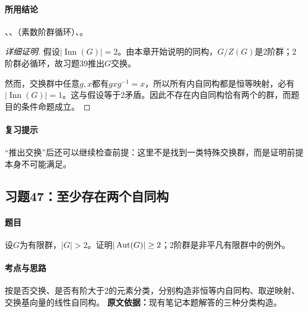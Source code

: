\paragraph{所用结论}、、（素数阶群循环）、。
\begin{proof}[详细证明]
假设$|\operatorname{Inn}(G)|=2$。由本章开始说明的同构，$G/Z(G)$是2阶群；2阶群必循环，故习题39推出$G$交换。

然而，交换群中任意$g,x$都有$gxg^{-1}=x$，所以所有内自同构都是恒等映射，必有$|\operatorname{Inn}(G)|=1$。这与假设等于2矛盾。因此不存在内自同构恰有两个的群，而题目的条件命题成立。
\end{proof}
\paragraph{复习提示}“推出交换”后还可以继续检查前提：这里不是找到一类特殊交换群，而是证明前提本身不可能满足。

\subsection{习题47：至少存在两个自同构}
\paragraph{题目}设$G$为有限群，$|G|>2$。证明$|\operatorname{Aut}(G)|\ge2$；2阶群是非平凡有限群中的例外。
\paragraph{考点与思路}按是否交换、是否有阶大于2的元素分类，分别构造非恒等内自同构、取逆映射、交换基向量的线性自同构。
\textbf{原文依据：}现有笔记本题解答的三种分类构造。
